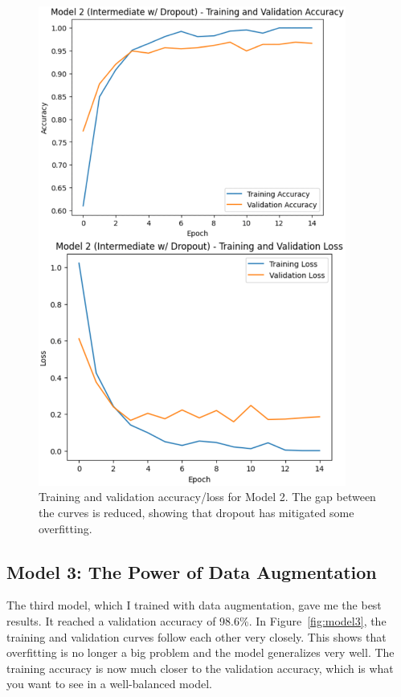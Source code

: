 \documentclass[pdflatex,sn-mathphys-num]{sn-jnl}%
\theoremstyle{thmstyleone}%
\theoremstyle{thmstyletwo}%
\theoremstyle{thmstylethree}%
\begin{document}
\begin{figure}[htbp]
\centering
\includegraphics[width=0.9\textwidth]{model2_curves.png}
\caption{Training and validation accuracy/loss for Model 2. The gap between the curves is reduced, showing that dropout has mitigated some overfitting.}\label{fig:model2}
\end{figure}

\subsection{Model 3: The Power of Data Augmentation}
The third model, which I trained with data augmentation, gave me the best results. It reached a validation accuracy of 98.6\%. In Figure~\ref{fig:model3}, the training and validation curves follow each other very closely. This shows that overfitting is no longer a big problem and the model generalizes very well. The training accuracy is now much closer to the validation accuracy, which is what you want to see in a well-balanced model.
\end{document}
